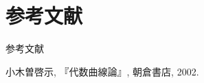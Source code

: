 \documentclass[dvipdfmx,12pt,aspectratio=169]{beamer}%
\begin{document}
\section{参考文献}

\begin{frame}[allowframebreaks]{参考文献}
    \begin{thebibliography}{Og02}\beamertemplatetextbibitems
         小木曽啓示, 
        『代数曲線論』, 朝倉書店, 2002.
    \end{thebibliography}
\end{frame}

\end{document}
